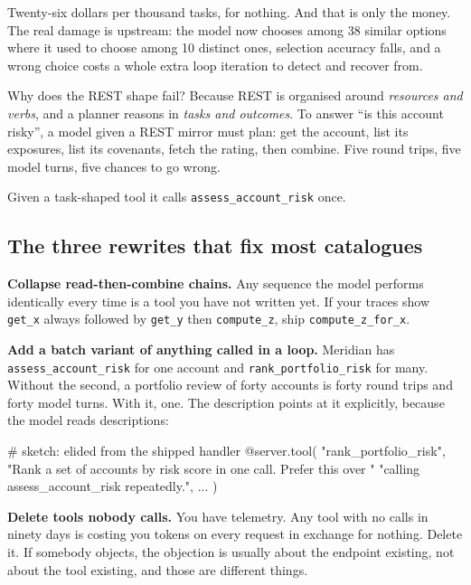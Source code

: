 Twenty-six dollars per thousand tasks, for nothing. And that is only the money.
The real damage is upstream: the model now chooses among 38 similar options
where it used to choose among 10 distinct ones, selection accuracy falls, and a wrong choice
costs a whole extra loop iteration to detect and recover from.

Why does the REST shape fail? Because REST is organised around \emph{resources
and verbs}, and a planner reasons in \emph{tasks and outcomes}. To answer ``is
this account risky'', a model given a REST mirror must plan: get the account,
list its exposures, list its covenants, fetch the rating, then combine. Five
round trips, five model turns, five chances to go wrong.

Given a task-shaped tool it calls \texttt{assess\_account\_risk} once.


\subsection{The three rewrites that fix most catalogues}

\textbf{Collapse read-then-combine chains.} Any sequence the model performs
identically every time is a tool you have not written yet. If your traces show
\texttt{get\_x} always followed by \texttt{get\_y} then \texttt{compute\_z},
ship \texttt{compute\_z\_for\_x}.

\textbf{Add a batch variant of anything called in a loop.} Meridian has
\texttt{assess\_account\_risk} for one account and
\texttt{rank\_portfolio\_risk} for many. Without the second, a portfolio review
of forty accounts is forty round trips and forty model turns. With it, one.
The description points at it explicitly, because the model reads descriptions:

\begin{py}
# sketch: elided from the shipped handler
@server.tool(
    "rank_portfolio_risk",
    "Rank a set of accounts by risk score in one call. Prefer this over "
    "calling assess_account_risk repeatedly.",
    ...
)
\end{py}

\textbf{Delete tools nobody calls.} You have telemetry. Any tool with no calls
in ninety days is costing you tokens on every request in exchange for nothing.
Delete it. If somebody objects, the objection is usually about the endpoint
existing, not about the tool existing, and those are different things.


